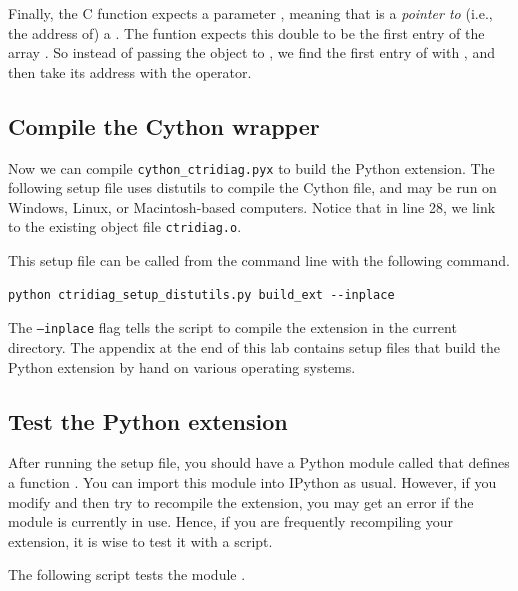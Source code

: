 Finally, the C function expects a parameter , meaning that  is a \emph{pointer to} (i.e., the address of) a .
The funtion  expects this double to be the first entry of the array .
So instead of passing the object  to , we find the first entry of  with , and then take its address with the \li{&} operator.





\subsection*{Compile the Cython wrapper}

Now we can compile \texttt{cython\_ctridiag.pyx} to build the Python extension.
The following setup file uses distutils to compile the Cython file, and may be run on Windows, Linux, or Macintosh-based computers.
Notice that in line 28, we link to the existing object file \texttt{ctridiag.o}.



This setup file can be called from the command line with the following command.
\begin{lstlisting}[style=ShellInput]
python ctridiag_setup_distutils.py build_ext --inplace
\end{lstlisting}
The \texttt{--inplace} flag tells the script to compile the extension in the current directory.
The appendix at the end of this lab contains setup files that build the Python extension by hand on various operating systems.





\subsection*{Test the Python extension}
After running the setup file, you should have a Python module called  that defines a function .
You can import this module into IPython as usual.
However, if you modify  and then try to recompile the extension, you may get an error if the module is currently in use.
Hence, if you are frequently recompiling your extension, it is wise to test it  with a script.

The following script tests the module .


